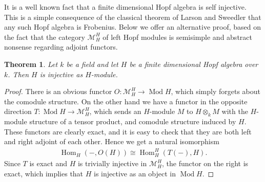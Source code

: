 \documentclass{article}
\newtheorem*{Theorem}{Theorem}
\DeclareMathOperator\Hom{Hom}
\DeclareMathOperator\Mod{Mod}
\begin{document}
It is a well known fact that a finite dimensional Hopf algebra is self injective. 
This is a simple consequence of the classical theorem of Larson and Sweedler
that any such Hopf algebra is Frobenius. Below we offer an alternative proof,
based on the fact that the category $\mathcal M^H_H$ of left Hopf modules is 
semisimple and abstract nonsense regarding adjoint functors.

\begin{Theorem}
Let $k$ be a field and let $H$ be a finite dimensional Hopf algebra over $k$. 
Then $H$ is injective as $H$-module.
\end{Theorem}
\begin{proof}
There is an obvious functor $O: \mathcal M^H_H \to \Mod H$, which simply forgets
about the comodule structure. On the other hand we have a functor in the opposite
direction $T: \Mod H \to \mathcal M^H_H$, which sends an $H$-module $M$ to $H
\otimes_k M$ with the $H$-module structure of a tensor product, and comodule
structure induced by $H$. These functors are clearly exact, and it is easy
to check that they are both left and right adjoint of each other. Hence
we get a natural isomorphism
\begin{align*}
\Hom_H(-,O(H)) \cong \Hom^H_H(T(-),H).
\end{align*}
Since $T$ is exact and $H$ is trivially injective in $\mathcal M^H_H$, the
functor on the right is exact, which implies that $H$ is injective as an
object in $\Mod H$.
\end{proof}
\end{document}
